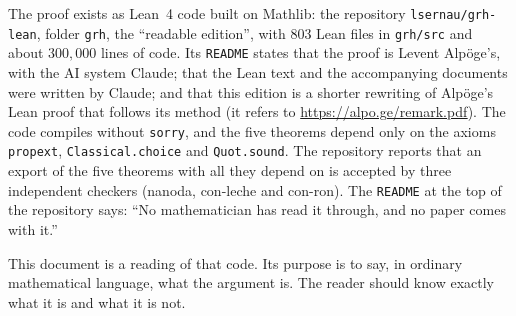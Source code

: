 The proof exists as Lean~4 code built on Mathlib: the repository \texttt{lsernau/grh-lean}, folder
\texttt{grh}, the ``readable edition'', with 803 Lean files in \texttt{grh/src} and about
$300{,}000$ lines of code. Its \texttt{README} states that the proof is Levent Alp\"oge's, with the
AI system Claude; that the Lean text and the accompanying documents were written by Claude; and
that this edition is a shorter rewriting of Alp\"oge's Lean proof that follows its method
(it refers to \url{https://alpo.ge/remark.pdf}). The code compiles without \texttt{sorry}, and the
five theorems depend only on the axioms \texttt{propext}, \texttt{Classical.choice} and
\texttt{Quot.sound}. The repository reports that an export of the five theorems with all they
depend on is accepted by three independent checkers (nanoda, con-leche and con-ron). The
\texttt{README} at the top of the repository says: ``No mathematician has read it through, and
no paper comes with it.''

This document is a reading of that code. Its purpose is to say, in ordinary mathematical
language, what the argument is. The reader should know exactly what it is and what it is not.

